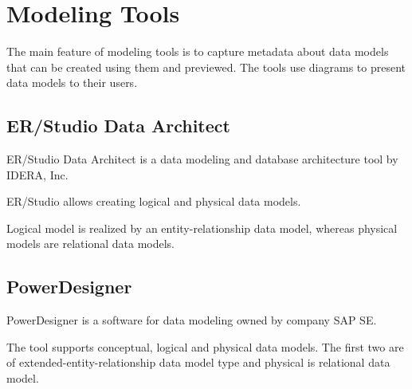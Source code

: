 \chapter{Modeling Tools}

The main feature of modeling tools is to capture metadata about data models that can be created using them and previewed. The tools use diagrams to present data models to their users.




\section{ER/Studio Data Architect}

ER/Studio Data Architect is a data modeling and database architecture tool by IDERA, Inc. 

ER/Studio allows creating logical and physical data models.

Logical model is realized by an entity-relationship data model, whereas physical models are relational data models.



\section{PowerDesigner}

PowerDesigner is a software for data modeling owned by company SAP SE.

The tool supports conceptual, logical and physical data models. The first two are of extended-entity-relationship data model type and physical is relational data model. 
